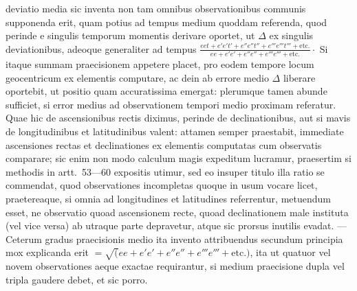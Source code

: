 deviatio media sic inventa non tam omnibus observationibus communis
supponenda erit, quam potius ad tempus medium quoddam referenda, quod perinde
e singulis temporum momentis derivare oportet, ut $\Delta$ ex singulis
deviationibus, adeoque generaliter ad tempus
$\frac{eet+e'e't'+e''e''t''+e'''e'''t'''+\text{etc.}}{ee+e'e'+e''e''+e'''e'''+\text{etc.}}\mathpunct{\cdot}$
Si itaque summam praecisionem appetere placet, pro eodem tempore locum
geocentricum ex elementis computare, ac dein ab errore medio $\Delta$ liberare
oportebit, ut positio quam accuratissima emergat: plerumque tamen abunde
sufficiet, si error medius ad observationem tempori medio proximam referatur.
Quae hic de ascensionibus rectis diximus, perinde de declinationibus, aut si
mavis de longitudinibus et latitudinibus valent: attamen semper praestabit,
immediate ascensiones rectas et declinationes ex elementis computatas cum
observatis comparare; sic enim non modo calculum magis expeditum lucramur,
praesertim si methodis in artt.\ 53---60 expositis utimur, sed eo insuper
titulo illa ratio se commendat, quod observationes incompletas quoque in usum
vocare licet, praetereaque, si omnia ad longitudines et latitudines
referrentur, metuendum esset, ne observatio quoad ascensionem recte, quoad
declinationem male instituta (vel vice versa) ab utraque parte depravetur,
atque sic prorsus inutilis evadat. --- Ceterum gradus praecisionis medio ita
invento attribuendus secundum principia mox explicanda erit
$=\surd(ee+e'e'+e''e''+e'''e'''+\text{etc.})$, ita ut quatuor vel novem
observationes aeque exactae requirantur, si medium praecisione
dupla vel tripla gaudere debet, et sic porro.

